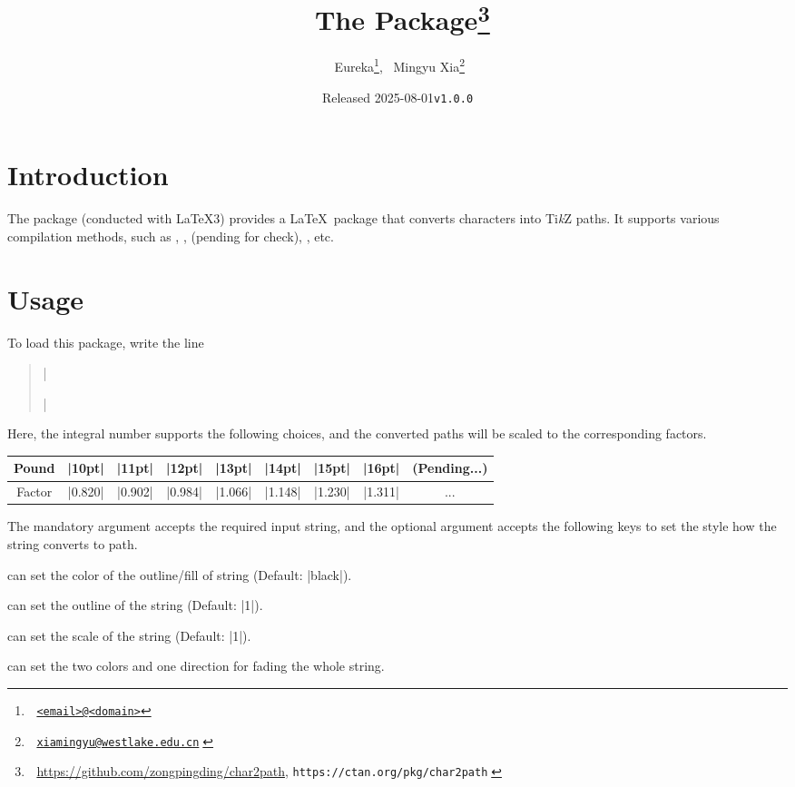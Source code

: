 \documentclass[lm-default]{l3doc}
\title{^^A
  The \pkg{char2path} Package\thanks{^^A
    \url{https://github.com/zongpingding/char2path},
    \texttt{https://ctan.org/pkg/char2path}^^A
  }^^A
}
\author{^^A
  Eureka\thanks{^^A
    \href{mailto:<email>@<domain>}{\texttt{<email>@<domain>}}},~
  Mingyu Xia\thanks{^^A
    \href{mailto:xiamingyu@westlake.edu.cn}{\texttt{xiamingyu@westlake.edu.cn}}^^A
  }^^A
}
\date{Released 2025-08-01\quad \texttt{v1.0.0}}
\begin{document}
\maketitle

\begin{documentation}

\section{Introduction}

The  package (conducted with \LaTeX3) provides
a \LaTeX\ package that converts characters into Ti\textit k\/Z paths.
It supports various compilation methods, such as ,
,  (pending for check), , etc.

\section{Usage}

To load this package, write the line
\begin{quote}
  |\usepackage[scale = ||pt]{char2path}|
\end{quote}

Here, the integral number  supports the following choices,
and the converted paths will be scaled to the corresponding factors.

\begin{center}
  \begin{tabular}{*9c}
    \toprule
    Pound   & |10pt|  & |11pt|  & |12pt|  &
    |13pt|  & |14pt|  & |15pt|  & |16pt|  & (Pending...)\\
    \midrule
    Factor  & |0.820| & |0.902| & |0.984| &
    |1.066| & |1.148| & |1.230| & |1.311| & ...\\
    \bottomrule
  \end{tabular}
\end{center}

\begin{function}{\chartopath}
  \begin{syntax}
      
  \end{syntax}
  The mandatory argument accepts the required input string, and the optional
  argument accepts the following keys to set the style how the string converts
  to path.
  \begin{keyval}
    \item [\key{draw,fill}]  can set the color of the outline/fill of string
    (Default: |black|).
    \item [\key{outline}]  can set the outline of the string
    (Default: |1|).
    \item [\key{scale}]  can set the scale of the string
    (Default: |1|).
    \item [\key{fading}]  can set the two colors and one direction for fading the whole string.
  \end{keyval}
\end{function}


\end{documentation}
\end{document}

